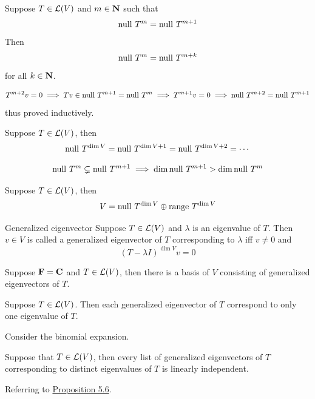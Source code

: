 \documentclass[12pt,a4paper]{article}
\begin{document}
    \begin{prop}
    	Suppose $T\in\mathcal{L}(V)$ and $m\in\mathbf{N}$ such that
    	$$
    	\operatorname{null\,} T^m=\operatorname{null\,} T^{m+1}
    	$$
    	Then
    	$$
    	\operatorname{null\,} T^m=\operatorname{null\,} T^{m+k}
    	$$
    	for all $k\in\mathbf{N}$.
    \end{prop}
    \begin{remark}
    	$$
    	T^{m+2}v=0\implies Tv\in\operatorname{null\,} T^{m+1}=\operatorname{null\,} T^m\implies T^{m+1}v=0\implies \operatorname{null\,} T^{m+2}=\operatorname{null\,} T^{m+1}
    	$$
    	thus proved inductively.
    \end{remark}
    \hfill
    
    \begin{prop}
    	Suppose $T\in\mathcal{L}(V)$, then 
    	$$
    	\operatorname{null\,} T^{\dim V}=\operatorname{null\,} T^{\dim V+1}=\operatorname{null\,} T^{\dim V+2}=\cdots
    	$$
    \end{prop}
    \begin{remark}
    	$$
    	\operatorname{null\,} T^m\subsetneq\operatorname{null\,} T^{m+1}\implies\dim\operatorname{null\,} T^{m+1}>\dim\operatorname{null\,} T^m
    	$$
    \end{remark}
    \hfill
    
    \begin{prop}
    	Suppose $T\in\mathcal{L}(V)$, then
    	$$
    	V=\operatorname{null\,} T^{\dim V}\oplus\operatorname{range\,} T^{\dim V}
    	$$
    \end{prop}
    \hfill
    
    \begin{defi}{Generalized eigenvector}
    	Suppose $T\in\mathcal{L}(V)$ and $\lambda$ is an eigenvalue of $T$. Then $v\in V$ is called a generalized eigenvector of $T$ corresponding to $\lambda$ iff $v\neq0$ and
    	$$
    	(T-\lambda I)^{\dim V}v=0
    	$$
    \end{defi}
    \hfill
    
    \begin{prop}
    	Suppose $\mathbf{F}=\mathbf{C}$ and $T\in\mathcal{L}(V)$, then there is a basis of $V$ consisting of generalized eigenvectors of $T$.
    \end{prop}
    \hfill

    \begin{prop}
        Suppose $T\in\mathcal{L}(V)$. Then each generalized eigenvector of $T$ correspond to only one eigenvalue of $T$.
    \end{prop}
    \begin{remark}
        Consider the binomial expansion.
    \end{remark}

    \begin{prop}\label{8.8}
        Suppose that $T\in\mathcal{L}(V)$, then every list of generalized eigenvectors of $T$ corresponding to distinct eigenvalues of $T$ is linearly independent.
    \end{prop}
    \begin{remark}
        Referring to \hyperref[5.6]{Proposition 5.6}.
    \end{remark}
    \hfill
\end{document}
